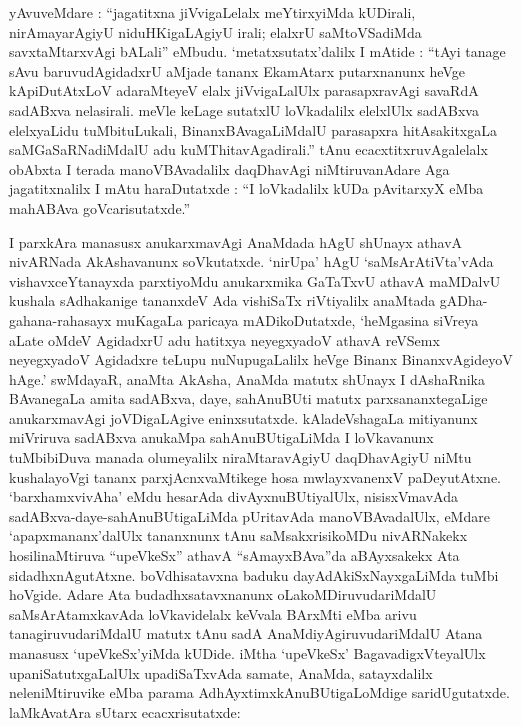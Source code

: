 yAvuveMdare : ``jagatitxna jiVvigaLelalx meYtirxyiMda kUDirali, nirAmayarAgiyU niduHKigaLAgiyU irali; elalxrU saMtoVSadiMda savxtaMtarxvAgi bALali'' eMbudu. `metatxsutatx'dalilx I mAtide : ``tAyi tanage sAvu baruvudAgidadxrU aMjade tananx EkamAtarx putarxnanunx heVge kApiDutAtxLoV adaraMteyeV elalx jiVvigaLalUlx parasapxravAgi savaRdA sadABxva nelasirali. meVle keLage sutatxlU loVkadalilx elelxlUlx sadABxva elelxyaLidu tuMbituLukali, BinanxBAvagaLiMdalU parasapxra hitAsakitxgaLa saMGaSaRNadiMdalU adu kuMThitavAgadirali.'' tAnu ecacxtitxruvAgalelalx obAbxta I terada manoVBAvadalilx daqDhavAgi niMtiruvanAdare Aga jagatitxnalilx I mAtu haraDutatxde : ``I loVkadalilx kUDa pAvitarxyX eMba mahABAva goVcarisutatxde.''

I parxkAra manasusx anukarxmavAgi AnaMdada hAgU shUnayx athavA nivARNada AkAshavanunx soVkutatxde. `nirUpa' hAgU `saMsArAtiVta'vAda vishavxceYtanayxda parxti\-yoMdu anukarxmika GaTaTxvU athavA maMDalvU kushala sAdhakanige tananxdeV Ada vishiSaTx riVtiyalilx anaMtada gADha-gahana-rahasayx muKagaLa paricaya mADikoDu\-tatxde, `heMgasina siVreya aLate oMdeV AgidadxrU adu hatitxya neyegxyadoV athavA reVSemx neyegxyadoV Agidadxre teLupu nuNupugaLalilx heVge Binanx BinanxvAgideyoV hAge.' swMdayaR, anaMta AkAsha, AnaMda matutx shUnayx I dAshaRnika BAvanegaLa amita sadABxva, daye, sahAnuBUti matutx parxsananxtegaLige anukarxmavAgi joVDigaLAgive eninx\-sutatxde. kAladeVshagaLa mitiyanunx miVriruva sadABxva anukaMpa sahAnuBUti\-gaLiMda I loVkavanunx tuMbibiDuva manada olumeyalilx niraMtara\-vAgiyU daqDhavAgiyU niMtu kushalayoVgi tananx parxjAcnxvaMtikege hosa mwlayxvanenxV paDeyutAtxne. `barxhamx\-vivAha' eMdu hesarAda divAyxnuBUtiyalUlx, nisisxVmavAda sadABxva-daye-sahAnuBUti\-gaLiMda pUritavAda manoVBAvadalUlx, eMdare `apapxmananx'dalUlx tananxnunx tAnu saMsakx\-risikoMDu nivARNakekx hosilinaMtiruva ``upeVkeSx'' athavA ``sAmayxBAva''da aBAyxsakekx Ata sidadhxnAgutAtxne. boVdhi\-satavxna baduku dayAdAkiSxNayxgaLiMda tuMbi hoVgide. Adare Ata budadhxsatavxnanunx oLa\-koMDiruvudariMdalU saMsArAtamxkavAda loVkavidelalx \hbox{keVvala} BArxMti eMba arivu tanagiruvudariMdalU matutx tAnu sadA AnaMdiyAgiruvuda\-riMdalU Atana manasusx `upeVkeSx'yiMda kUDide. iMtha `upeVkeSx' BagavadigxVteyalUlx upaniSatutxgaLalUlx upadiSaTxvAda samate, AnaMda, satayxdalilx neleniMtiruvike eMba parama AdhAyxtimxkAnuBUtigaLoMdige sari\-dUgutatxde. laMkAvatAra sUtarx ecacxrisu\-tatxde:
